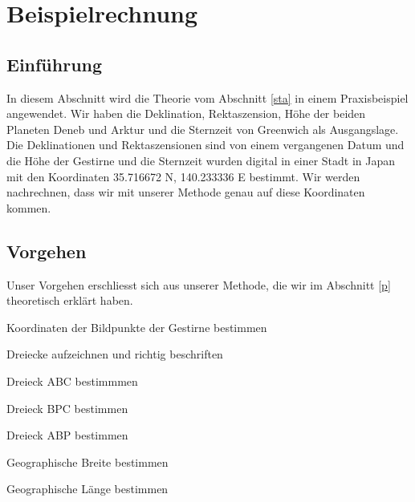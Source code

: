 \section{Beispielrechnung}

\subsection{Einführung}
In diesem Abschnitt wird die Theorie vom Abschnitt \ref{sta} in einem Praxisbeispiel angewendet. 
Wir haben die Deklination, Rektaszension, Höhe der beiden Planeten Deneb und Arktur und die Sternzeit von Greenwich als Ausgangslage.
Die Deklinationen und Rektaszensionen sind von einem vergangenen Datum und die Höhe der Gestirne und die Sternzeit wurden digital in einer Stadt in Japan mit den Koordinaten 35.716672 N, 140.233336 E bestimmt.
Wir werden nachrechnen, dass wir mit unserer Methode genau auf diese Koordinaten kommen.
\subsection{Vorgehen}
Unser Vorgehen erschliesst sich aus unserer Methode, die wir im Abschnitt \ref{p} theoretisch erklärt haben.
\begin{compactenum}
\item
Koordinaten der Bildpunkte der Gestirne bestimmen 
\item
Dreiecke aufzeichnen und richtig beschriften
\item
Dreieck ABC bestimmmen
\item
Dreieck BPC bestimmen 
\item
Dreieck ABP bestimmen 
\item
Geographische Breite bestimmen
\item
Geographische Länge bestimmen
\end{compactenum}

